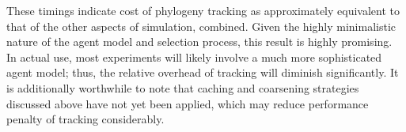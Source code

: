 These timings indicate cost of phylogeny tracking as approximately equivalent to that of the other aspects of simulation, combined.
Given the highly minimalistic nature of the agent model and selection process, this result is highly promising.
In actual use, most experiments will likely involve a much more sophisticated agent model; thus, the relative overhead of tracking will diminish significantly.
It is additionally worthwhile to note that caching and coarsening strategies discussed above have not yet been applied, which may reduce performance penalty of tracking considerably.

